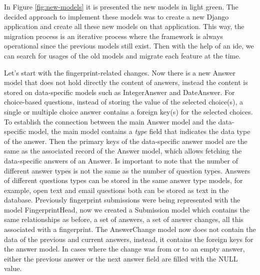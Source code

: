 In Figure \ref{fig:new-models} it is presented the new models in light green.
The decided approach to implement these models was to create a new Django application and create all these new models on that application.
This way, the migration process is an iterative process where the framework is always operational since the previous models still exist.
Then with the help of an \gls{ide}, we can search for usages of the old models and migrate each feature at the time.

Let's start with the fingerprint-related changes.
Now there is a new Answer model that does not hold directly the content of answers, instead the content is stored on data-specific models such as IntegerAnswer and DateAnswer.
For choice-based questions, instead of storing the value of the selected choice(s), a single or multiple choice answer contains a foreign key(s) for the selected choices.
To establish the connection between the main Answer model and the data-specific model, the main model contains a \textit{type} field that indicates the data type of the answer.
Then the primary keys of the data-specific answer model are the same as the associated record of the Answer model, which allows fetching the data-specific answers of an Answer.
Is important to note that the number of different answer types is not the same as the number of question types.
Answers of different questions types can be stored in the same answer type models, for example, open text and email questions both can be stored as text in the database.
Previously fingerprint submissions were being represented with the model FingerprintHead, now we created a Submission model which contains the same relationships as before, a set of answers, a set of answer changes, all this associated with a fingerprint.
The AnswerChange model now does not contain the data of the previous and current answers, instead, it contains the foreign keys for the answer model.
In cases where the change was from or to an empty answer, either the previous answer or the next answer field are filled with the NULL value.

